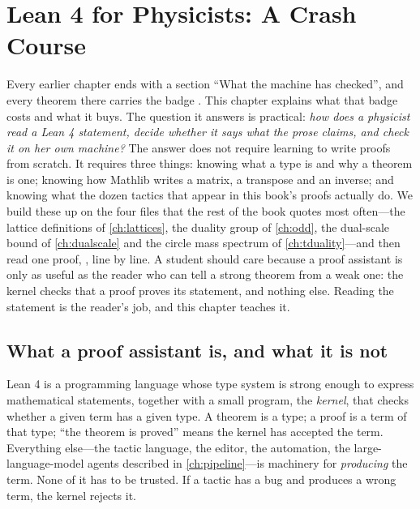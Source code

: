 \chapter{Lean 4 for Physicists: A Crash Course}\label{ch:leanprimer}

Every earlier chapter ends with a section ``What the machine has checked'', and every
theorem there carries the badge \TA. This chapter explains what that badge costs and what it
buys. The question it answers is practical: \emph{how does a physicist read a Lean 4
statement, decide whether it says what the prose claims, and check it on her own machine?}
The answer does not require learning to write proofs from scratch. It requires three things:
knowing what a type is and why a theorem is one; knowing how Mathlib writes a matrix, a
transpose and an inverse; and knowing what the dozen tactics that appear in this book's
proofs actually do. We build these up on the four files that the rest of the book quotes
most often---the lattice definitions of \cref{ch:lattices}, the duality group of
\cref{ch:odd}, the dual-scale bound of \cref{ch:dualscale} and the circle mass spectrum of
\cref{ch:tduality}---and then read one proof, , line by line. A
student should care because a proof assistant is only as useful as the reader who can tell
a strong theorem from a weak one: the kernel checks that a proof proves its statement, and
nothing else. Reading the statement is the reader's job, and this chapter teaches it.

\section{What a proof assistant is, and what it is not}\label{sec:leanprimer:kernel}

Lean 4 is a programming language whose type system is strong enough to
express mathematical statements, together with a small program, the
\emph{kernel}, that checks whether a given term has a given type. A
theorem is a type; a proof is a term of that type; ``the theorem is proved'' means the
kernel has accepted the term. Everything else---the tactic language, the editor, the
automation, the large-language-model agents described in \cref{ch:pipeline}---is
machinery for \emph{producing} the term. None of it has to be trusted. If a tactic has a
bug and produces a wrong term, the kernel rejects it.

